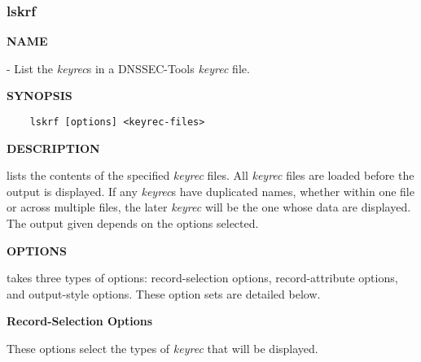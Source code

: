 \clearpage

\subsubsection{\bf lskrf}

{\bf NAME}

 - List the {\it keyrec}s in a DNSSEC-Tools {\it keyrec} file.

{\bf SYNOPSIS}

\begin{verbatim}
    lskrf [options] <keyrec-files>
\end{verbatim}

{\bf DESCRIPTION}

 lists the contents of the specified {\it keyrec} files.  All {\it
keyrec} files are loaded before the output is displayed.  If any {\it keyrec}s
have duplicated names, whether within one file or across multiple files, the
later {\it keyrec} will be the one whose data are displayed.  The output given
depends on the options selected.

{\bf OPTIONS}

 takes three types of options:  record-selection options,
record-attribute options, and output-style options.  These option sets
are detailed below.

{\bf Record-Selection Options}

These options select the types of {\it keyrec} that will be displayed.

